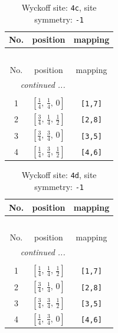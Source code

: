 \documentclass[fleqn,8pt]{jsarticle}
\begin{document}
\renewcommand{\arraystretch}{1.2}
\begin{longtable}{ccc}
\caption{Wyckoff site: {\tt 4c}, site symmetry: {\tt -1}}
 \\
 \hline \hline
No. & position & mapping \\ \hline \endfirsthead

\multicolumn{2}{l}{\tablename\ \thetable{}} \\
 \hline \hline
No. & position & mapping \\ \hline \endhead

 \hline \hline
\multicolumn{2}{r}{\footnotesize\it continued ...} \\ \endfoot

 \hline \hline
\multicolumn{2}{r}{} \\ \endlastfoot

1 & $\left[ \frac{1}{4},\, \frac{1}{4},\, 0 \right]$ & {\tt [1,7]} \\ \hline
2 & $\left[ \frac{3}{4},\, \frac{1}{4},\, \frac{1}{2} \right]$ & {\tt [2,8]} \\ \hline
3 & $\left[ \frac{3}{4},\, \frac{3}{4},\, 0 \right]$ & {\tt [3,5]} \\ \hline
4 & $\left[ \frac{1}{4},\, \frac{3}{4},\, \frac{1}{2} \right]$ & {\tt [4,6]} \\
\end{longtable}
\renewcommand{\arraystretch}{1.2}
\begin{longtable}{ccc}
\caption{Wyckoff site: {\tt 4d}, site symmetry: {\tt -1}}
 \\
 \hline \hline
No. & position & mapping \\ \hline \endfirsthead

\multicolumn{2}{l}{\tablename\ \thetable{}} \\
 \hline \hline
No. & position & mapping \\ \hline \endhead

 \hline \hline
\multicolumn{2}{r}{\footnotesize\it continued ...} \\ \endfoot

 \hline \hline
\multicolumn{2}{r}{} \\ \endlastfoot

1 & $\left[ \frac{1}{4},\, \frac{1}{4},\, \frac{1}{2} \right]$ & {\tt [1,7]} \\ \hline
2 & $\left[ \frac{3}{4},\, \frac{1}{4},\, 0 \right]$ & {\tt [2,8]} \\ \hline
3 & $\left[ \frac{3}{4},\, \frac{3}{4},\, \frac{1}{2} \right]$ & {\tt [3,5]} \\ \hline
4 & $\left[ \frac{1}{4},\, \frac{3}{4},\, 0 \right]$ & {\tt [4,6]} \\
\end{longtable}
\end{document}
